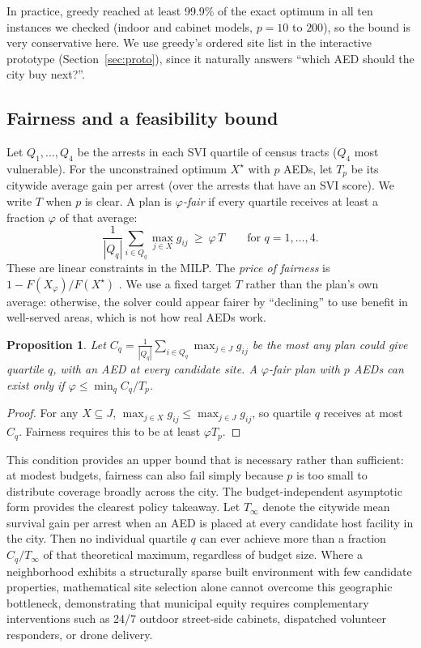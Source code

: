 \documentclass[11pt]{article}
\newtheorem{proposition}{Proposition}
\begin{document}
In practice, greedy reached at least 99.9\% of the exact optimum in all ten instances we checked (indoor and cabinet models, $p=10$ to $200$), so the bound is very conservative here. We use greedy's ordered site list in the interactive prototype (Section~\ref{sec:proto}), since it naturally answers ``which AED should the city buy next?''.

\subsection{Fairness and a feasibility bound}
Let $Q_1,\dots,Q_4$ be the arrests in each SVI quartile of census tracts ($Q_4$ most vulnerable). For the unconstrained optimum $X^\star$ with $p$ AEDs, let $T_p$ be its citywide average gain per arrest (over the arrests that have an SVI score). We write $T$ when $p$ is clear. A plan is \emph{$\varphi$-fair} if every quartile receives at least a fraction $\varphi$ of that average:
\[
\frac{1}{|Q_q|}\sum_{i\in Q_q}\max_{j\in X}g_{ij}\ \ge\ \varphi\,T\qquad\text{for } q=1,\dots,4.
\]
These are linear constraints in the MILP. The \emph{price of fairness} is $1-F(X_\varphi)/F(X^\star)$ \cite{bertsimas2011}. We use a fixed target $T$ rather than the plan's own average: otherwise, the solver could appear fairer by ``declining'' to use benefit in well-served areas, which is not how real AEDs work.

\begin{proposition}
Let $C_q=\frac{1}{|Q_q|}\sum_{i\in Q_q}\max_{j\in J}g_{ij}$ be the most any plan could give quartile $q$, with an AED at \emph{every} candidate site. A $\varphi$-fair plan with $p$ AEDs can exist only if $\varphi\le \min_q C_q/T_p$.
\end{proposition}
\begin{proof}
For any $X\subseteq J$, $\max_{j\in X} g_{ij}\le\max_{j\in J} g_{ij}$, so quartile $q$ receives at most $C_q$. Fairness requires this to be at least $\varphi T_p$.
\end{proof}
This condition provides an upper bound that is necessary rather than sufficient: at modest budgets, fairness can also fail simply because $p$ is too small to distribute coverage broadly across the city. The budget-independent asymptotic form provides the clearest policy takeaway. Let $T_\infty$ denote the citywide mean survival gain per arrest when an AED is placed at every candidate host facility in the city. Then no individual quartile $q$ can ever achieve more than a fraction $C_q/T_\infty$ of that theoretical maximum, regardless of budget size. Where a neighborhood exhibits a structurally sparse built environment with few candidate properties, mathematical site selection alone cannot overcome this geographic bottleneck, demonstrating that municipal equity requires complementary interventions such as 24/7 outdoor street-side cabinets, dispatched volunteer responders, or drone delivery.
\end{document}
